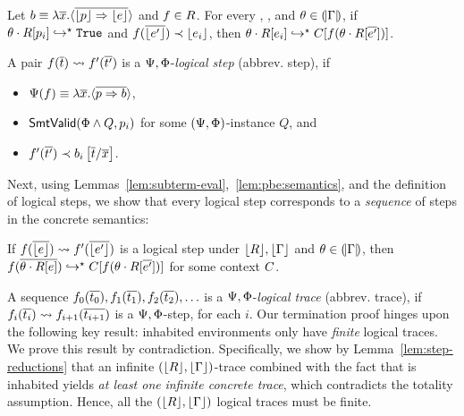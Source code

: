 \begin{lemma}\label{lem:subterm-eval}
Let $b \equiv \lambda \overline{x}. \langle \overline{\lfloor p\rfloor  \Rightarrow \lfloor e\rfloor } \rangle$ and
    $f \in R$.
%
For every \env, \RRenv, and $\theta \in (\!|\Gamma|\!)$,
if ${\theta \cdot R [p_i]}\hookrightarrow^{\star}{\texttt{True}}$ and
   $f({\overline{\lfloor e'\rfloor }}) \prec \lfloor e_i\rfloor $,
then
   ${{\theta \cdot R [e_i]}}\hookrightarrow^{\star}{{C}[f({\theta \cdot R [\overline{e'}]})]}$.
\end{lemma}

%
A pair
$f({\overline{t}}) \rightsquigarrow f'({\overline{t'}})$
is a
$\Psi,\Phi$-\emph{logical step} (abbrev. step),
if
%
\begin{itemize}
  \item $\Psi(f) \equiv \lambda \overline{x}. \langle \overline{p \Rightarrow b} \rangle$,
  \item $\mathsf{SmtValid}(\Phi \wedge Q, p_i)$ for some $(\Psi, \Phi)$-instance $Q$, and
  \item $\issubterm{\fapp{\rfun'}{\expr'}}{\SUBSTS{\body_i}{x}{\expr}}$.
\end{itemize}

%
Next, using Lemmas~\ref{lem:subterm-eval},~\ref{lem:pbe:semantics},
and the definition of logical steps, we show that every
logical step corresponds to a \emph{sequence} of steps
in the concrete semantics:

\begin{lemma}\label{lem:step-reductions}
If   $f({\overline{\lfloor e\rfloor }}) \rightsquigarrow f'({\overline{\lfloor e'\rfloor }})$
     is a logical step under $\lfloor R\rfloor , \lfloor \Gamma\rfloor $
		 and
		 $\theta\in (\!|\Gamma|\!)$,
then ${{f({\overline{\theta \cdot R [e]}})}}\hookrightarrow^{\star}{{C}[f({\theta \cdot R [\overline{e'}]})]}$
for some context $C$.
\end{lemma}

%
A sequence
%
$f_0({\overline{t_0}}),f_1({\overline{t_1}}),f_2({\overline{t_2}}),\ldots$
%
is a $\Psi,\Phi$-\emph{logical trace} (abbrev. trace),
if %
$f_i({\overline{t_i}}) \rightsquigarrow f_{i+1}({\overline{t_{i+1}}})$
is a $\Psi,\Phi$-step, for each $i$.
%
Our termination proof hinges upon the following
key result: inhabited environments only have
\emph{finite} logical traces.
%
We prove this result by contradiction.
%
Specifically, we show by Lemma~\ref{lem:step-reductions}
that an infinite $(\lfloor R\rfloor ,\lfloor \Gamma\rfloor )$-trace
combined with the fact that \env is inhabited
yields \textit{at least one}
\emph{infinite concrete trace},
which contradicts the totality assumption.
%
Hence, all the $(\lfloor R\rfloor ,\lfloor \Gamma\rfloor )$
logical traces must be finite.

